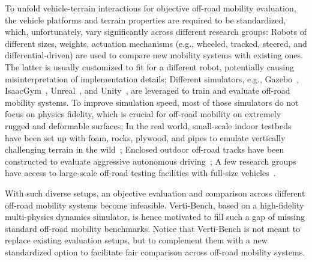 To unfold vehicle-terrain interactions for objective off-road mobility evaluation, the vehicle platforms and terrain properties are required to be standardized, which, unfortunately, vary significantly across different research groups: Robots of different sizes, weights, actuation mechanisms (e.g., wheeled, tracked, steered, and differential-driven) are used to compare new mobility systems with existing ones. The latter is usually customized to fit for a different robot, potentially causing misinterpretation of implementation details; Different simulators, e.g., Gazebo~\cite{rana2024towards}, IsaacGym~\cite{yu2024adaptive}, Unreal~\cite{young2020unreal}, and Unity~\cite{so2022sim}, are leveraged to train and evaluate off-road mobility systems. To improve simulation speed, most of those simulators do not focus on physics fidelity, which is crucial for off-road mobility on extremely rugged and deformable surfaces; In the real world, small-scale indoor testbeds have been set up with foam, rocks, plywood, and pipes to emulate vertically challenging terrain in the wild~\cite{xu2023efficient, datar2024toward, xiao2018review, xiao2015locomotive}; Enclosed outdoor off-road tracks have been constructed to evaluate aggressive autonomous driving~\cite{goldfain2019autorally, xiao2021learning, atreya2022high, karnan2022vi, pan2020imitation}; A few research groups have access to large-scale off-road testing facilities with full-size vehicles~\cite{triest2022tartandrive, han2023model, jiang2021rellis}. 

With such diverse setups, an objective evaluation and comparison across different off-road mobility systems become infeasible. Verti-Bench, based on a high-fidelity multi-physics dynamics simulator, is hence motivated to fill such a gap of missing standard off-road mobility benchmarks. Notice that Verti-Bench is not meant to replace existing evaluation setups, but to complement them with a new standardized option to facilitate fair comparison across off-road mobility systems. 





